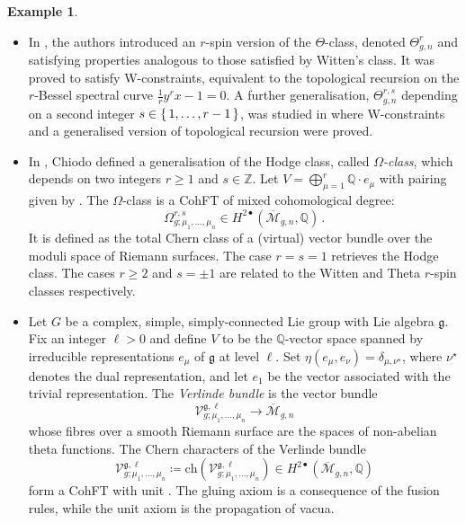 \documentclass[11pt,reqno]{amsart}
\numberwithin{equation}{section}
\newcommand{\ch}{\mathrm{ch}}
\newcommand{\mb}[1]{\mathbb{#1}}
\newcommand{\mc}[1]{\mathcal{#1}}
\newcommand{\mf}[1]{\mathfrak{#1}}
\newcommand{\msc}[1]{\mathscr{#1}}
\newcommand{\Z}{\mb{Z}}
\newcommand{\Q}{\mb{Q}}
\newcommand{\M}{\mc{M}}
\newcommand{\Mbar}{\overline{\M}}
\theoremstyle{plain}
\theoremstyle{definition}
\newtheorem{example}[theorem]{Example}
\begin{document}
\begin{example}
\begin{itemize}
    \item
    In \cite{CGG25}, the authors introduced an $r$-spin version of the $\Theta$-class, denoted $\Theta_{g,n}^{r}$ and satisfying properties analogous to those satisfied by Witten's class. It was proved to satisfy W-constraints, equivalent to the topological recursion on the $r$-Bessel spectral curve $\frac{1}{r}y^r x - 1 = 0$. A further generalisation, $\Theta_{g,n}^{r,s}$ depending on a second integer $s \in \set{1, \ldots, r-1}$, was studied in \cite{BCGS} where W-constraints and a generalised version of topological recursion were proved.

    \item
    In \cite{Chi08}, Chiodo defined a generalisation of the Hodge class, called \emph{$\Omega$-class}, which depends on two integers $r \ge 1$ and $s \in \Z$. Let $V = \bigoplus_{\mu = 1}^r \Q \cdot e_{\mu}$ with pairing given by . The $\Omega$-class is a CohFT of mixed cohomological degree:
    \begin{equation}
      \Omega^{r,s}_{g;\mu_1,\ldots,\mu_n} \in H^{2\bullet}(\Mbar_{g,n},\Q) \,.
    \end{equation}
    It is defined as the total Chern class of a (virtual) vector bundle over the moduli space of Riemann surfaces. The case $r = s = 1$ retrieves the Hodge class. The cases $r \ge 2$ and $s = \pm 1$ are related to the Witten and Theta $r$-spin classes respectively.

    \item
    Let $G$ be a complex, simple, simply-connected Lie group with Lie algebra $\mf{g}$. Fix an integer $\ell > 0$ and define $V$ to be the $\Q$-vector space spanned by irreducible representations $e_{\mu}$ of $\mf{g}$ at level $\ell$. Set $\eta(e_{\mu},e_{\nu}) = \delta_{\mu,\nu^{\star}}$, where $\nu^{\star}$ denotes the dual representation, and let $e_1$ be the vector associated with the trivial representation. The \emph{Verlinde bundle} is the vector bundle
    \begin{equation}
      \mc{V}^{\mf{g},\ell}_{g;\mu_1,\ldots,\mu_n} \longrightarrow \Mbar_{g,n}
    \end{equation}
    whose fibres over a smooth Riemann surface are the spaces of non-abelian theta functions. The Chern characters of the Verlinde bundle
    \begin{equation}
      \msc{V}^{\mf{g},\ell}_{g;\mu_1,\ldots,\mu_n}
      \coloneqq
      \ch(\mc{V}^{\mf{g},\ell}_{g;\mu_1,\ldots,\mu_n}) \in H^{2\bullet}(\Mbar_{g,n},\Q)
    \end{equation}
    form a CohFT with unit \cite{MOPPZ17}. The gluing axiom is a consequence of the fusion rules, while the unit axiom is the propagation of vacua.


\end{itemize}
\end{example}
\end{document}

